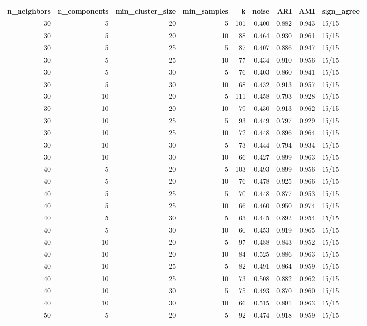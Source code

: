 \begin{tabular}{rrrrrrrrl}
\toprule
n_neighbors & n_components & min_cluster_size & min_samples & k & noise & ARI & AMI & sign_agree \\
\midrule
30 & 5 & 20 & 5 & 101 & 0.400 & 0.882 & 0.943 & 15/15 \\
30 & 5 & 20 & 10 & 88 & 0.464 & 0.930 & 0.961 & 15/15 \\
30 & 5 & 25 & 5 & 87 & 0.407 & 0.886 & 0.947 & 15/15 \\
30 & 5 & 25 & 10 & 77 & 0.434 & 0.910 & 0.956 & 15/15 \\
30 & 5 & 30 & 5 & 76 & 0.403 & 0.860 & 0.941 & 15/15 \\
30 & 5 & 30 & 10 & 68 & 0.432 & 0.913 & 0.957 & 15/15 \\
30 & 10 & 20 & 5 & 111 & 0.458 & 0.793 & 0.928 & 15/15 \\
30 & 10 & 20 & 10 & 79 & 0.430 & 0.913 & 0.962 & 15/15 \\
30 & 10 & 25 & 5 & 93 & 0.449 & 0.797 & 0.929 & 15/15 \\
30 & 10 & 25 & 10 & 72 & 0.448 & 0.896 & 0.964 & 15/15 \\
30 & 10 & 30 & 5 & 73 & 0.444 & 0.794 & 0.934 & 15/15 \\
30 & 10 & 30 & 10 & 66 & 0.427 & 0.899 & 0.963 & 15/15 \\
40 & 5 & 20 & 5 & 103 & 0.493 & 0.899 & 0.956 & 15/15 \\
40 & 5 & 20 & 10 & 76 & 0.478 & 0.925 & 0.966 & 15/15 \\
40 & 5 & 25 & 5 & 70 & 0.448 & 0.877 & 0.953 & 15/15 \\
40 & 5 & 25 & 10 & 66 & 0.460 & 0.950 & 0.974 & 15/15 \\
40 & 5 & 30 & 5 & 63 & 0.445 & 0.892 & 0.954 & 15/15 \\
40 & 5 & 30 & 10 & 60 & 0.453 & 0.919 & 0.965 & 15/15 \\
40 & 10 & 20 & 5 & 97 & 0.488 & 0.843 & 0.952 & 15/15 \\
40 & 10 & 20 & 10 & 84 & 0.525 & 0.886 & 0.963 & 15/15 \\
40 & 10 & 25 & 5 & 82 & 0.491 & 0.864 & 0.959 & 15/15 \\
40 & 10 & 25 & 10 & 73 & 0.508 & 0.882 & 0.962 & 15/15 \\
40 & 10 & 30 & 5 & 75 & 0.493 & 0.870 & 0.960 & 15/15 \\
40 & 10 & 30 & 10 & 66 & 0.515 & 0.891 & 0.963 & 15/15 \\
50 & 5 & 20 & 5 & 92 & 0.474 & 0.918 & 0.959 & 15/15 \\

\end{tabular}
